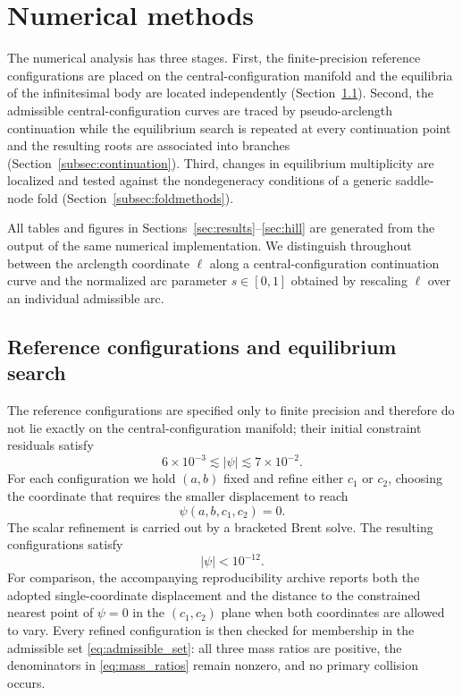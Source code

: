 \section{Numerical methods}
\label{sec:methods}

The numerical analysis has three stages. First, the finite-precision
reference configurations are placed on the central-configuration manifold
and the equilibria of the infinitesimal body are located independently
(Section~\ref{subsec:eqsearch}). Second, the admissible central-configuration curves are traced
by pseudo-arclength continuation while the equilibrium search is repeated
at every continuation point and the resulting roots are associated into
branches (Section~\ref{subsec:continuation}). Third, changes in equilibrium multiplicity are
localized and tested against the nondegeneracy conditions of a generic
saddle-node fold (Section~\ref{subsec:foldmethods}).

All tables and figures in Sections~\ref{sec:results}--\ref{sec:hill} are generated from the output of the
same numerical implementation. We distinguish throughout between the
arclength coordinate $\ell$ along a central-configuration continuation
curve and the normalized arc parameter $s\in[0,1]$ obtained by rescaling
$\ell$ over an individual admissible arc.


\subsection{Reference configurations and equilibrium search}
\label{subsec:eqsearch}

The reference configurations are specified only to finite precision and
therefore do not lie exactly on the central-configuration manifold; their
initial constraint residuals satisfy
\[
6\times10^{-3}
\lesssim |\psi|
\lesssim
7\times10^{-2}.
\]
For each configuration we hold $(a,b)$ fixed and refine either $c_1$ or
$c_2$, choosing the coordinate that requires the smaller displacement to
reach
\[
\psi(a,b,c_1,c_2)=0.
\]
The scalar refinement is carried out by a bracketed Brent solve. The
resulting configurations satisfy
\[
|\psi|<10^{-12}.
\]
For comparison, the accompanying reproducibility archive reports both the
adopted single-coordinate displacement and the distance to the constrained
nearest point of $\psi=0$ in the $(c_1,c_2)$ plane when both coordinates are
allowed to vary. Every refined configuration is then checked for membership in the
admissible set \eqref{eq:admissible_set}: all three mass ratios are positive,
the denominators in \eqref{eq:mass_ratios} remain nonzero, and no primary
collision occurs.

